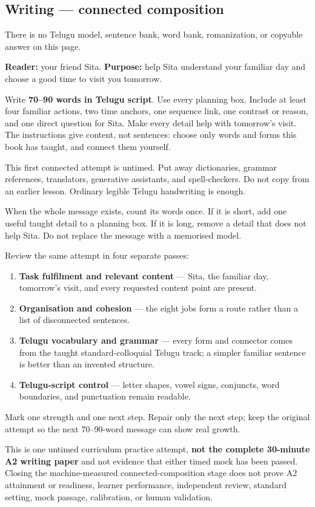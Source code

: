 \subsection*{Writing — connected composition}
There is no Telugu model, sentence bank, word bank, romanization, or copyable answer on this page.

\textbf{Reader:} your friend Sita. \textbf{Purpose:} help Sita understand your familiar day and choose a good time to visit you tomorrow.

Write \textbf{70–90 words in Telugu script}. Use every planning box. Include at least four familiar actions, two time anchors, one sequence link, one contrast or reason, and one direct question for Sita. Make every detail help with tomorrow's visit. The instructions give content, not sentences: choose only words and forms this book has taught, and connect them yourself.

This first connected attempt is untimed. Put away dictionaries, grammar references, translators, generative assistants, and spell-checkers. Do not copy from an earlier lesson. Ordinary legible Telugu handwriting is enough.

When the whole message exists, count its words once. If it is short, add one useful taught detail to a planning box. If it is long, remove a detail that does not help Sita. Do not replace the message with a memorised model.

\begin{tcolorbox}[breakable,colback=teal!4,colframe=teal!35!black,title={Before you move on}]
Review the same attempt in four separate passes:

\begin{enumerate}
\raggedright
  \item \textbf{Task fulfilment and relevant content} — Sita, the familiar day, tomorrow's visit, and every requested content point are present.
  \item \textbf{Organisation and cohesion} — the eight jobs form a route rather than a list of disconnected sentences.
  \item \textbf{Telugu vocabulary and grammar} — every form and connector comes from the taught standard-colloquial Telugu track; a simpler familiar sentence is better than an invented structure.
  \item \textbf{Telugu-script control} — letter shapes, vowel signs, conjuncts, word boundaries, and punctuation remain readable.
\end{enumerate}

Mark one strength and one next step. Repair only the next step; keep the original attempt so the next 70–90-word message can show real growth.

This is one untimed curriculum practice attempt, \textbf{not the complete 30-minute A2 writing paper} and not evidence that either timed mock has been passed. Closing the machine-measured connected-composition stage does not prove A2 attainment or readiness, learner performance, independent review, standard setting, mock passage, calibration, or human validation.
\end{tcolorbox}

